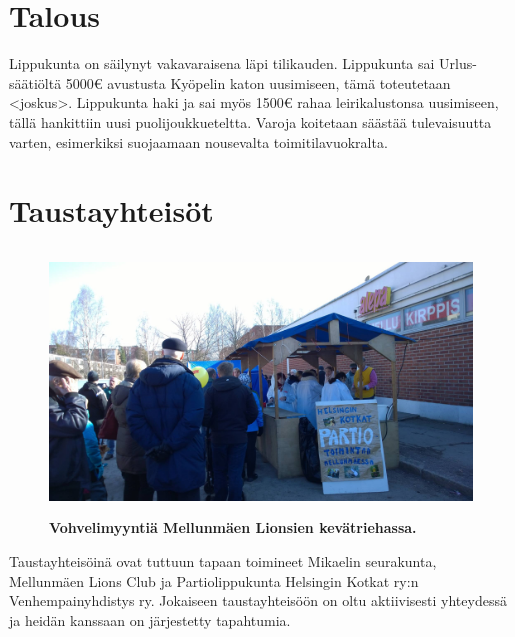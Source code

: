 \documentclass[a4paper, 12pt, finnish]{report} %
\begin{document}
\section{Talous}
Lippukunta on säilynyt vakavaraisena läpi tilikauden. Lippukunta sai Urlus-säätiöltä 5000\euro{} avustusta Kyöpelin katon uusimiseen, tämä toteutetaan <joskus>. Lippukunta haki ja sai myös 1500\euro{} rahaa leirikalustonsa uusimiseen, tällä hankittiin uusi puolijoukkueteltta. Varoja koitetaan säästää tulevaisuutta varten, esimerkiksi suojaamaan nousevalta toimitilavuokralta.
\section{Taustayhteisöt}
\begin{figure}[htb]
	\begin{center}
		\includegraphics[height=7cm]{lettukestit.jpg}
	\end{center}
	\caption*{\textbf{Vohvelimyyntiä Mellunmäen Lionsien kevätriehassa.}}
\end{figure}

Taustayhteisöinä ovat tuttuun tapaan toimineet Mikaelin seurakunta, Mellunmäen Lions Club ja Partiolippukunta Helsingin Kotkat ry:n Venhempainyhdistys ry. Jokaiseen taustayhteisöön on oltu aktiivisesti yhteydessä ja heidän kanssaan on järjestetty tapahtumia.
\end{document}
